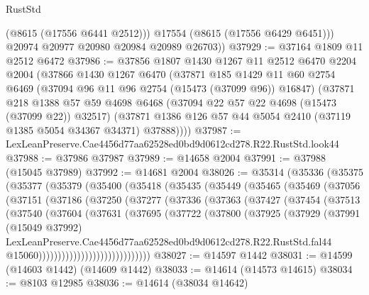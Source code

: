 \begin{lexlean}{RustStd}
\begin{coremodule}
            (@8615 (@17556 @6441 @2512)))
          @17554
          (@8615 (@17556 @6429 @6451)))
        @20974
        @20977
        @20980
        @20984
        @20989
        @26703))
@37929 := @37164 @1809 @11 @2512 @6472
@37986 := @37856
    @1807
    @1430
    @1267
    @11
    @2512
    @6470
    @2204
    @2004
    (@37866
      @1430
      @1267
      @6470
      (@37871
        @185
        @1429
        @11
        @60
        @2754
        @6469
        (@37094 @96 @11 @96 @2754 (@15473 (@37099 @96)) @16847)
        (@37871
          @218
          @1388
          @57
          @59
          @4698
          @6468
          (@37094 @22 @57 @22 @4698 (@15473 (@37099 @22)) @32517)
          (@37871 @1386 @126 @57 @44 @5054 @2410 (@37119 @1385 @5054 @34367 @34371) @37888))))
@37987 := LexLeanPreserve.Cae4456d77aa62528ed0bd9d0612cd278.R22.RustStd.look44
@37988 := @37986 @37987
@37989 := @14658 @2004
@37991 := @37988 (@15045 @37989)
@37992 := @14681 @2004
@38026 := @35314
    (@35336
      (@35375
        (@35377
          (@35379
            (@35400
              (@35418
                (@35435
                  (@35449
                    (@35465
                      (@35469
                        (@37056
                          (@37151
                            (@37186
                              (@37250
                                (@37277
                                  (@37336
                                    (@37363
                                      (@37427
                                        (@37454
                                          (@37513
                                            (@37540
                                              (@37604
                                                (@37631
                                                  (@37695
                                                    (@37722
                                                      (@37800
                                                        (@37925
                                                          (@37929
                                                            (@37991
                                                              (@15049 @37992)
                                                              LexLeanPreserve.Cae4456d77aa62528ed0bd9d0612cd278.R22.RustStd.fal44
                                                              @15060)))))))))))))))))))))))))))))
@38027 := @14597 @1442
@38031 := @14599 (@14603 @1442) (@14609 @1442)
@38033 := @14614 (@14573 @14615)
@38034 := @8103 @12985
@38036 := @14614 (@38034 @14642)

\end{coremodule}
\end{lexlean}
